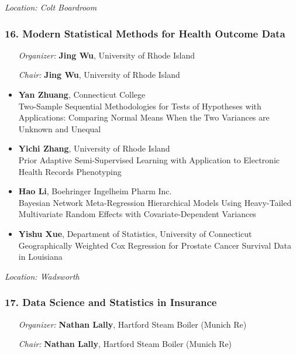 \emph{Location: Colt Boardroom}

\subsubsection*{16. Modern Statistical Methods for Health Outcome Data}

\begin{enumerate}[align=left]
\item [\emph{Organizer:}] \textbf{Jing Wu}, University of Rhode Island
\item [\emph{Chair:}] \textbf{Jing Wu}, University of Rhode Island
\end{enumerate}

\begin{itemize}
\item \textbf{Yan Zhuang}, Connecticut College \\
Two-Sample Sequential Methodologies for Tests of Hypotheses with Applications: Comparing Normal Means When the Two Variances are Unknown and Unequal
\item \textbf{Yichi Zhang}, University of Rhode Island \\
Prior Adaptive Semi-Supervised Learning with Application to Electronic Health Records Phenotyping
\item \textbf{Hao Li}, Boehringer Ingelheim Pharm Inc. \\
Bayesian Network Meta-Regression Hierarchical Models Using Heavy-Tailed Multivariate Random Effects with Covariate-Dependent Variances
\item \textbf{Yishu Xue}, Department of Statistics, University of Connecticut \\
Geographically Weighted Cox Regression for Prostate Cancer Survival Data in Louisiana
\end{itemize}

\emph{Location: Wadsworth}

\subsubsection*{17. Data Science and Statistics in Insurance}

\begin{enumerate}[align=left]
\item [\emph{Organizer:}] \textbf{Nathan Lally}, Hartford Steam Boiler (Munich Re)
\item [\emph{Chair:}] \textbf{Nathan Lally}, Hartford Steam Boiler (Munich Re)
\end{enumerate}

